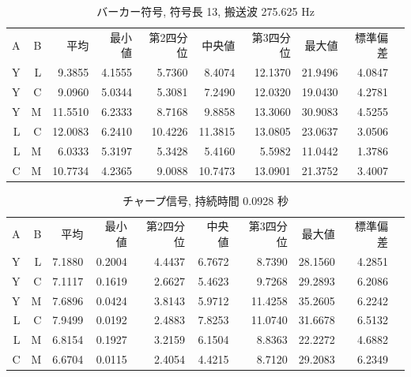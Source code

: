 \begin{table}[p]\centering
  \caption{バーカー符号, 符号長 13, 搬送波 275.625 Hz}
  \label{tab:hikaku3}
  \begin{tabular}{rrrrrrrrrr}
    \hline
     A & B & 平均 & 最小値 & 第2四分位 & 中央値 & 第3四分位 & 最大値 & 標準偏差 \\
     Y & L & 9.3855 & 4.1555 & 5.7360 & 8.4074 & 12.1370 & 21.9496 & 4.0847 \\
     Y & C & 9.0960 & 5.0344 & 5.3081 & 7.2490 & 12.0320 & 19.0430 & 4.2781 \\
     Y & M & 11.5510 & 6.2333 & 8.7168 & 9.8858 & 13.3060 & 30.9083 & 4.5255 \\
     L & C & 12.0083 & 6.2410 & 10.4226 & 11.3815 & 13.0805 & 23.0637 & 3.0506 \\
     L & M & 6.0333 & 5.3197 & 5.3428 & 5.4160 & 5.5982 & 11.0442 & 1.3786 \\
     C & M & 10.7734 & 4.2365 & 9.0088 & 10.7473 & 13.0901 & 21.3752 & 3.4007 \\
    \hline
  \end{tabular}
\end{table}



\clearpage




\begin{table}[p]\centering
  \caption{チャープ信号, 持続時間 0.0928 秒} %
  \label{tab:hikaku4}
  \begin{tabular}{rrrrrrrrrr}
    \hline
     A & B & 平均 & 最小値 & 第2四分位 & 中央値 & 第3四分位 & 最大値 & 標準偏差 \\
     Y & L & 7.1880 & 0.2004 & 4.4437 & 6.7672 & 8.7390 & 28.1560 & 4.2851 \\
     Y & C & 7.1117 & 0.1619 & 2.6627 & 5.4623 & 9.7268 & 29.2893 & 6.2086 \\
     Y & M & 7.6896 & 0.0424 & 3.8143 & 5.9712 & 11.4258 & 35.2605 & 6.2242 \\
     L & C & 7.9499 & 0.0192 & 2.4883 & 7.8253 & 11.0740 & 31.6678 & 6.5132 \\
     L & M & 6.8154 & 0.1927 & 3.2159 & 6.1504 & 8.8363 & 22.2272 & 4.6882 \\
     C & M & 6.6704 & 0.0115 & 2.4054 & 4.4215 & 8.7120 & 29.2083 & 6.2349 \\
    \hline
  \end{tabular}
\end{table}

